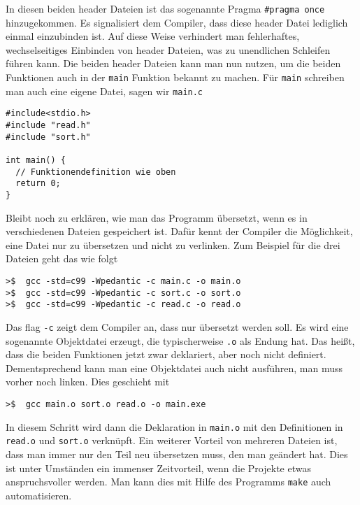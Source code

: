 In diesen beiden header Dateien ist das sogenannte Pragma \verb|#pragma once| hinzugekommen.
Es signalisiert dem Compiler, dass diese header Datei lediglich einmal einzubinden ist.
Auf diese Weise verhindert man fehlerhaftes, wechselseitiges Einbinden von header Dateien, was zu unendlichen Schleifen führen kann.
Die beiden header Dateien kann man nun nutzen, um die beiden Funktionen auch in der \texttt{main} Funktion bekannt zu machen.
Für \texttt{main} schreiben man auch eine eigene Datei, sagen wir \texttt{main.c}
\begin{lstlisting}[caption={Datei \texttt{main.c}}, belowcaptionskip=0.3em]
#include<stdio.h>
#include "read.h"
#include "sort.h"

int main() {
  // Funktionendefinition wie oben
  return 0;
}
\end{lstlisting}
Bleibt noch zu erklären, wie man das Programm übersetzt, wenn es in verschiedenen Dateien gespeichert ist.
Dafür kennt der Compiler die Möglichkeit, eine Datei nur zu übersetzen und nicht zu verlinken.
Zum Beispiel für die drei Dateien geht das wie folgt

\vspace*{0.5cm}
\begin{verbatim}
>$  gcc -std=c99 -Wpedantic -c main.c -o main.o
>$  gcc -std=c99 -Wpedantic -c sort.c -o sort.o
>$  gcc -std=c99 -Wpedantic -c read.c -o read.o
\end{verbatim}
\vspace*{0.5cm}

Das flag \texttt{-c} zeigt dem Compiler an, dass nur übersetzt werden soll.
Es wird eine sogenannte Objektdatei erzeugt, die typischerweise \texttt{.o} als Endung hat.
Das heißt, dass die beiden Funktionen jetzt zwar deklariert, aber noch nicht definiert.
Dementsprechend kann man eine Objektdatei auch nicht ausführen, man muss vorher noch linken.
Dies geschieht mit

\vspace*{0.5cm}
\begin{verbatim}
>$  gcc main.o sort.o read.o -o main.exe
\end{verbatim}
\vspace*{0.5cm}

In diesem Schritt wird dann die Deklaration in \texttt{main.o} mit den Definitionen in \texttt{read.o} und \texttt{sort.o} verknüpft.
Ein weiterer Vorteil von mehreren Dateien ist, dass man immer nur den Teil neu übersetzen muss, den man geändert hat.
Dies ist unter Umständen ein immenser Zeitvorteil, wenn die Projekte etwas anspruchsvoller werden.
Man kann dies mit Hilfe des Programms \texttt{make} auch automatisieren.

\endinput
